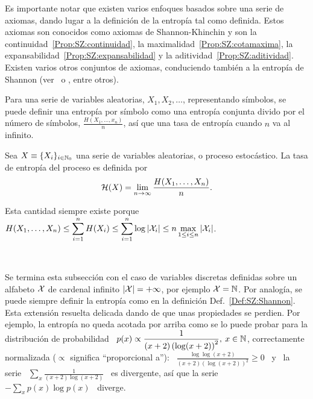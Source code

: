 Es  importante notar  que existen  varios enfoques  basados sobre  una  serie de
axiomas, dando lugar a la definici\'on de la entrop\'ia tal como definida. Estos
axiomas   son   conocidos   como   axiomas   de  Shannon-Khinchin   y   son   la
continuidad~\ref{Prop:SZ:continuidad},  la maximalidad~\ref{Prop:SZ:cotamaxima},
la           expansabilidad~\ref{Prop:SZ:expansabilidad}           y          la
aditividad~\ref{Prop:SZ:aditividad}.  Existen varios otros conjuntos de axiomas,
conduciendo  tambi\'en a  la entrop\'ia  de Shannon  (ver~\cite[Sec.~6]{Sha48} o
\cite{ShaWea64, Fad56, Fad58, Khi57, Ren61}, entre otros).

Para  una  serie de  variables  aleatorias,  $X_1,  X_2, \ldots$,  representando
s\'imbolos, se  puede definir una  entrop\'ia por s\'imbolo como  una entrop\'ia
conjunta  divido por el  n\'umero de  s\'imbolos, $\frac{H(X_1,\ldots,x_n)}{n}$,
as\'i que una tasa de entrop\'ia cuando $n$ va al infinito.
%
\begin{definicion}
\label{Def:SZ:TasaDeEntropia}
%
  Sea $X \equiv \{ X_i \}_{i  \in \mathbb{N}_0}$ una serie de variables aleatorias, o
  proceso estoc\'astico.  La tasa de entrop\'ia del proceso es definida por
  \[
  \mathcal{H}(X) = \lim_{n \to \infty} \frac{H(X_1,\ldots,X_n)}{n}.
  \]
\end{definicion}
%
\noindent Esta  cantidad siempre existe  porque $\displaystyle H(X_1 ,  \ldots ,
X_n) \le \sum_{i=1}^n H(X_i) \le \sum_{i=1}^n  \log |\mathcal{X}_i| \le n \max_{1 \le i
  \le n} |\mathcal{X}_i|$.

\

Se termina esta subsecci\'on con el caso de variables discretas definidas sobre
un  alfabeto $\mathcal{X}$ de  cardenal infinito  $|\mathcal{X}| =  + \infty$,  por ejemplo  $\mathcal{X} =
\mathbb{N}$.   Por analog\'ia,  se puede  siempre definir  la entrop\'ia  como  en la
definici\'on Def.~\ref{Def:SZ:Shannon}. Esta extensi\'on resuelta delicada dando
de que unas propiedades se perdien.  Por ejemplo, la entrop\'ia no queda acotada
por arriba  como se  lo puede  probar para la  distribuci\'on de  probabilidad \
$\displaystyle p(x)  \propto \frac{1}{(x+2) \left(  \log (x+2) \right)^2},  \: x
\in \mathbb{N}$, correctamente  normalizada ($\propto$ significa ``proporcional a''):
\ $\displaystyle \frac{\log \log(x+2)}{(x+2) \left( \log (x+2) \right)^2} \ge 0$
\  y  \ la  serie  \  $\displaystyle \sum_x  \frac{1}{(x+2)  \log  (x+2)}$ \  es
divergente,  as\'i que  la serie  \ $\displaystyle  - \sum_x  p(x) \log  p(x)$ \
diverge.


